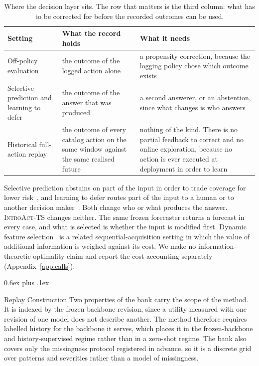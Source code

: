 \documentclass{article}
\makeatletter
\newcommand{\introact}{\textsc{IntroAct-TS}}
\def\subsection{\@startsection{subsection}{2}{\z@}{-1.4ex plus -0.4ex minus -.2ex}%
  {0.6ex plus .1ex}{\normalsize\sc\raggedright}}
\makeatother
\begin{document}
\begin{table}[h]
  \caption{Where the decision layer sits. The row that matters is the third column: what has to
  be corrected for before the recorded outcomes can be used.}
  \label{tab:app-positioning}
  \centering
  \small
  \setlength{\tabcolsep}{4pt}
\begin{tabular}{@{}p{} p{} p{}@{}}
    \toprule
    Setting & What the record holds & What it needs \\
    \midrule
    Off-policy evaluation & the outcome of the logged action alone & a propensity correction, because the logging policy chose which outcome exists \\
    Selective prediction and learning to defer & the outcome of the answer that was produced & a second answerer, or an abstention, since what changes is who answers \\
    Historical full-action replay & the outcome of every catalog action on the same window against the same realised future & nothing of the kind. There is no partial feedback to correct and no online exploration, because no action is ever executed at deployment in order to learn \\
    \bottomrule
  \end{tabular}
\end{table}

Selective prediction abstains on part of the input in order to trade coverage for lower
risk~\citep{chow1970optimum,vovk2005algorithmic,geifman2017selective,lei2018distribution}, and
learning to defer routes part of the input to a human or to another decision
maker~\citep{madras2018predict,mozannar2020consistent}. Both change who or what produces the
answer. \introact{} changes neither. The same frozen forecaster returns a forecast in every
case, and what is selected is whether the input is modified first. Dynamic feature
selection~\citep{he2024dime} is a related sequential-acquisition setting in which the value of
additional information is weighed against its cost. We make no information-theoretic
optimality claim and report the cost accounting separately (Appendix~\ref{app:calls}).

\subsection{Replay Construction}
\label{app:replay}
Two properties of the bank carry the scope of the method. It is indexed by the frozen backbone
revision, since a utility measured with one revision of one model does not describe another.
The method therefore requires labelled history for the backbone it serves, which places it in
the frozen-backbone and history-supervised regime rather than in a zero-shot regime. The bank also
covers only the missingness protocol registered in advance, so it is a discrete grid over
patterns and severities rather than a model of missingness.
\end{document}
